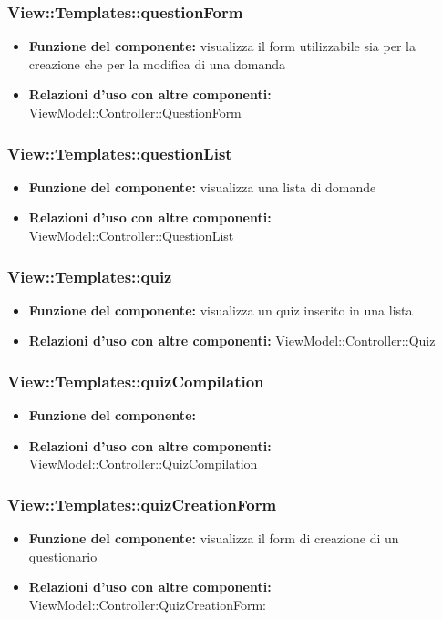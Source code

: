 \subsubsection{View::Templates::questionForm}
\begin{itemize}
\item\textbf{Funzione del componente:} visualizza il form utilizzabile sia per la creazione che per la modifica di una domanda\\
\item\textbf{Relazioni d'uso con altre componenti:} ViewModel::Controller::QuestionForm\\
\end{itemize}
\subsubsection{View::Templates::questionList}
\begin{itemize}
\item\textbf{Funzione del componente:} visualizza una lista di domande\\
\item\textbf{Relazioni d'uso con altre componenti:} ViewModel::Controller::QuestionList\\
\end{itemize}
\subsubsection{View::Templates::quiz}
\begin{itemize}
\item\textbf{Funzione del componente:} visualizza un quiz inserito in una lista\\
\item\textbf{Relazioni d'uso con altre componenti:} ViewModel::Controller::Quiz\\
\end{itemize}
\subsubsection{View::Templates::quizCompilation}
\begin{itemize}
\item\textbf{Funzione del componente:} \\
\item\textbf{Relazioni d'uso con altre componenti:} ViewModel::Controller::QuizCompilation\\
\end{itemize}
\subsubsection{View::Templates::quizCreationForm}
\begin{itemize}
\item\textbf{Funzione del componente:} visualizza il form di creazione di un questionario\\
\item\textbf{Relazioni d'uso con altre componenti:} ViewModel::Controller:QuizCreationForm:\\
\end{itemize}




